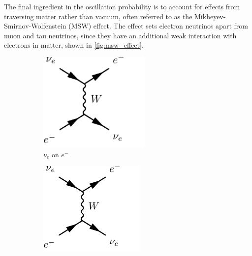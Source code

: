 The final ingredient in the oscillation probability is to account for effects from traversing matter rather than vacuum, often referred to as the Mikheyev-Smirnov-Wolfenstein (MSW) effect\cite{barger,parke,wolfenstein,msw}. The effect sets electron neutrinos apart from muon and tau neutrinos, since they have an additional weak interaction with electrons in matter, shown in \autoref{fig:msw_effect}.
\begin{figure}[h]
	\centering
	\begin{subfigure}[t]{0.32\textwidth}
		\centering
		\includegraphics[width=0.6\textwidth, trim={0mm 0mm 7mm 0mm}, clip, page=1]{figures/theory/feynmp_crop}
		\caption{$\nu_e$ on $e^-$}
	\end{subfigure}
	\begin{subfigure}[t]{0.32\textwidth}
		\centering
		\includegraphics[width=.8\textwidth, trim={0mm 0mm 2mm 0mm}, clip, page=3]{figures/theory/feynmp_crop}

\end{subfigure}
\end{figure}
